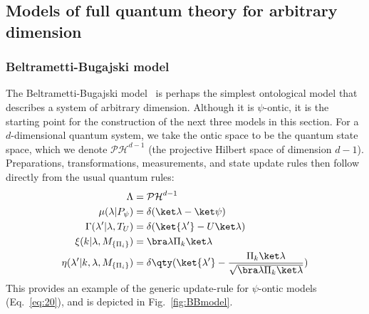 \documentclass[%
 reprint,
superscriptaddress,
nofootinbib,
 amsmath,amssymb,
 prx, 
 accepted=2019-09-27,
]{quantumarticle}
\begin{document}
\subsection{Models of full quantum theory for arbitrary dimension}

\subsubsection{Beltrametti-Bugajski model}
\label{sec:beltr-bugajski-model}
The Beltrametti-Bugajski
model~\cite{Beltrametticlassicalextensionquantum1995,Leiferquantumstatereal2014}
is perhaps the simplest ontological model that describes a system of
arbitrary dimension. Although it is $\psi$-ontic, it is the starting
point for the construction of the next three models in this
section. For a $d$-dimensional quantum system, we take the ontic space
to be the quantum state space, which we denote $\mathcal{PH}^{d-1}$
(the projective Hilbert space of dimension $d-1$). Preparations,
transformations, measurements, and state update rules then follow
directly from the usual quantum rules:
\begin{align}
  \Lambda
  &= \mathcal{PH}^{d-1}\nonumber\\
  \mu(\lambda|P_\psi)
  &=\delta(\ket\lambda-\ket\psi)\nonumber\\
  \Gamma(\lambda'|\lambda,T_U)
  &= \delta(\ket{\lambda'}-U\ket\lambda)\nonumber\\
  \xi(k|\lambda,M_{\{\Pi_i\}})
  &= \bra\lambda \Pi_k\ket\lambda\nonumber\\
  \eta(\lambda'|k,\lambda,M_{\{\Pi_i\}})
  &= \delta\qty(\ket{\lambda'}-\frac{\Pi_k\ket\lambda}
    {\sqrt{\bra\lambda \Pi_k\ket\lambda}})
\end{align}
This provides an example of the generic update-rule for $\psi$-ontic
models (Eq.~\ref{eq:20}), and is depicted in Fig.~\ref{fig:BBmodel}.
\end{document}
